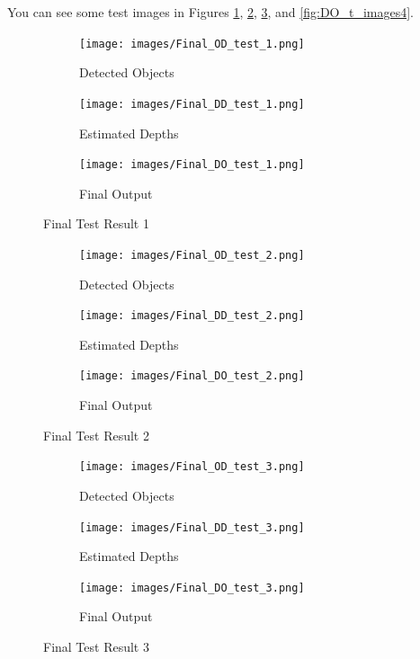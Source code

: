 \documentclass[a4paper, openany]{book}
\begin{document}
	
	
You can see some test images in Figures \ref{fig:DO_t_images1}, \ref{fig:DO_t_images2}, \ref{fig:DO_t_images3}, and \ref{fig:DO_t_images4}.

\begin{figure}[ht]
  \centering
    \begin{subfigure}[b]{0.45\linewidth}
    \texttt{[image: images/Final\_OD\_test\_1.png]}
    \caption{Detected Objects}
  \end{subfigure}
  \begin{subfigure}[b]{0.45\linewidth}
    \texttt{[image: images/Final\_DD\_test\_1.png]}
    \caption{Estimated Depths}
  \end{subfigure}
      \begin{subfigure}[b]{0.9\linewidth}
    \texttt{[image: images/Final\_DO\_test\_1.png]}
    \caption{Final Output}
  \end{subfigure}
  
      \caption{Final Test Result 1}
  \label{fig:DO_t_images1}
\end{figure}

\newpage

\begin{figure}[ht]
  \centering
    \begin{subfigure}[b]{0.45\linewidth}
    \texttt{[image: images/Final\_OD\_test\_2.png]}
    \caption{Detected Objects}
  \end{subfigure}
  \begin{subfigure}[b]{0.45\linewidth}
    \texttt{[image: images/Final\_DD\_test\_2.png]}
    \caption{Estimated Depths}
  \end{subfigure}
      \begin{subfigure}[b]{0.9\linewidth}
    \texttt{[image: images/Final\_DO\_test\_2.png]}
    \caption{Final Output}
  \end{subfigure}
  
      \caption{Final Test Result 2}
  \label{fig:DO_t_images2}
\end{figure}

\newpage


\begin{figure}[ht]
  \centering
    \begin{subfigure}[b]{0.45\linewidth}
    \texttt{[image: images/Final\_OD\_test\_3.png]}
    \caption{Detected Objects}
  \end{subfigure}
  \begin{subfigure}[b]{0.45\linewidth}
    \texttt{[image: images/Final\_DD\_test\_3.png]}
    \caption{Estimated Depths}
  \end{subfigure}
      \begin{subfigure}[b]{0.9\linewidth}
    \texttt{[image: images/Final\_DO\_test\_3.png]}
    \caption{Final Output}
  \end{subfigure}
  
      \caption{Final Test Result 3}
  \label{fig:DO_t_images3}
\end{figure}
\end{document}
